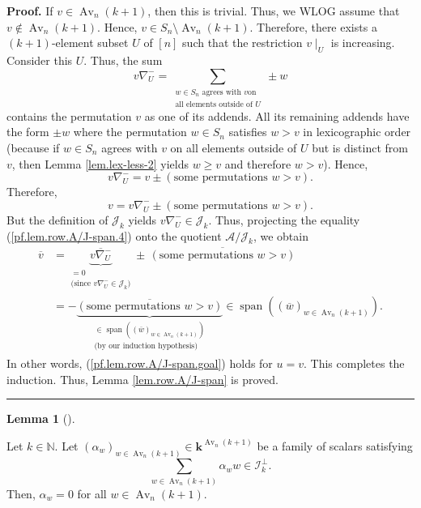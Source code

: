 \documentclass[numbers=enddot,12pt,final,onecolumn,notitlepage]{scrartcl}%
\numberwithin{exer}{subsection}
\theoremstyle{definition}
\newtheorem{lem}[theo]{Lemma}
\newenvironment{lemma}[1][]
{\begin{lem}[#1]\begin{leftbar}}
{\end{leftbar}\end{lem}}
\newenvironment{proof}[1][Proof]{\noindent\textbf{#1.} }{\ \rule{0.5em}{0.5em}}
\let\sumnonlimits\sum
\renewcommand{\sum}{\sumnonlimits\limits}
\begin{document}
\begin{proof}
If $v\in\operatorname*{Av}\nolimits_{n}\left(  k+1\right)  $, then this is
trivial. Thus, we WLOG assume that $v\notin\operatorname*{Av}\nolimits_{n}%
\left(  k+1\right)  $. Hence, $v\in S_{n}\setminus\operatorname*{Av}%
\nolimits_{n}\left(  k+1\right)  $. Therefore, there exists a $\left(
k+1\right)  $-element subset $U$ of $\left[  n\right]  $ such that the
restriction $v\mid_{U}$ is increasing. Consider this $U$. Thus, the sum
\[
v\nabla_{U}^{-}=\sum_{\substack{w\in S_{n}\text{ agrees with }v\text{
on}\\\text{all elements outside of }U}}\pm w
\]
contains the permutation $v$ as one of its addends. All its remaining addends
have the form $\pm w$ where the permutation $w\in S_{n}$ satisfies $w>v$ in
lexicographic order (because if $w\in S_{n}$ agrees with $v$ on all elements
outside of $U$ but is distinct from $v$, then Lemma \ref{lem.lex-less-2}
yields $w\geq v$ and therefore $w>v$). Hence,%
\[
v\nabla_{U}^{-}=v\pm\left(  \text{some permutations }w>v\right)  .
\]
Therefore,%
\begin{equation}
v=v\nabla_{U}^{-}\pm\left(  \text{some permutations }w>v\right)  .
\label{pf.lem.row.A/J-span.4}%
\end{equation}
But the definition of $\mathcal{J}_{k}$ yields $v\nabla_{U}^{-}\in
\mathcal{J}_{k}$. Thus, projecting the equality (\ref{pf.lem.row.A/J-span.4})
onto the quotient $\mathcal{A}/\mathcal{J}_{k}$, we obtain%
\begin{align*}
\overline{v}  &  =\underbrace{\overline{v\nabla_{U}^{-}}}%
_{\substack{=0\\\text{(since }v\nabla_{U}^{-}\in\mathcal{J}_{k}\text{)}}%
}\pm\,\overline{\left(  \text{some permutations }w>v\right)  }\\
&  =-\underbrace{\overline{\left(  \text{some permutations }w>v\right)  }%
}_{\substack{\in\operatorname*{span}\left(  \left(  \overline{w}\right)
_{w\in\operatorname*{Av}\nolimits_{n}\left(  k+1\right)  }\right)  \\\text{(by
our induction hypothesis)}}}\in\operatorname*{span}\left(  \left(
\overline{w}\right)  _{w\in\operatorname*{Av}\nolimits_{n}\left(  k+1\right)
}\right)  .
\end{align*}
In other words, (\ref{pf.lem.row.A/J-span.goal}) holds for $u=v$. This
completes the induction. Thus, Lemma \ref{lem.row.A/J-span} is proved.
\end{proof}

\begin{lemma}
\label{lem.row.I-c1}Let $k\in\mathbb{N}$. Let $\left(  \alpha_{w}\right)
_{w\in\operatorname*{Av}\nolimits_{n}\left(  k+1\right)  }\in\mathbf{k}%
^{\operatorname*{Av}\nolimits_{n}\left(  k+1\right)  }$ be a family of scalars
satisfying%
\[
\sum_{w\in\operatorname*{Av}\nolimits_{n}\left(  k+1\right)  }\alpha_{w}%
w\in\mathcal{I}_{k}^{\perp}.
\]
Then, $\alpha_{w}=0$ for all $w\in\operatorname*{Av}\nolimits_{n}\left(
k+1\right)  $.
\end{lemma}
\end{document}
